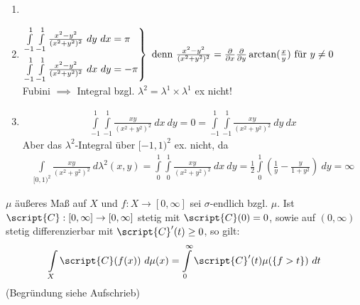   \begin{example}
    \begin{enumerate}
      \item[]
      \item 
          $\begin{rcases}
            \int\limits_{-1}^1 \int\limits_{-1}^1 \frac{x^2-y^2}{(x^2+y^2)^2} \ dy \ dx = \pi\\
            \int\limits_{-1}^1 \int\limits_{-1}^1 \frac{x^2-y^2}{(x^2+y^2)^2} \ dx \ dy = -\pi
          \end{rcases} \text{ denn } \frac{x^2-y^2}{(x^2+y^2)^2} = \frac{\partial}{\partial x} \frac{\partial}{\partial y} \arctan(\frac{x}{y}) \text{ für } y \neq 0$\\
          Fubini $\implies$ Integral bzgl. $\lambda^2 = \lambda^1 \times \lambda^1$ ex nicht!
      \item
        \begin{align*}
          \int\limits_{-1}^1 \int\limits_{-1}^1 \frac{xy}{(x^2+y^2)^2} \ dx \ dy = 0 = \int\limits_{-1}^1 \int\limits_{-1}^1 \frac{xy}{(x^2+y^2)^2} \ dy \ dx
        \end{align*}
        Aber das $\lambda^2$-Integral über $[-1,1)^2$ ex. nicht, da
        \begin{align*}
          \int\limits_{[0,1)^2} \frac{xy}{(x^2+y^2)^2} \ d\lambda^2(x,y) = \int\limits_0^1 \int\limits_0^1 \frac{xy}{(x^2+y^2)^2} \ dx \ dy = \frac{1}{2} \int\limits_0^1 (\frac{1}{y} - \frac{y}{1+y^2}) \ dy = \infty
        \end{align*}
    \end{enumerate}
  \end{example}

  \begin{example}
    $\mu$ äußeres Maß auf $X$ und $f: X \to [0, \infty]$ sei $\sigma$-endlich bzgl. $\mu$. Ist $\script{C}:[0,\infty] \to [0, \infty]$ stetig mit $\script{C}(0) = 0$, sowie auf $(0, \infty)$ stetig differenzierbar mit $\script{C}'(t)\geq0$, so gilt:
    \begin{align*}
      \int\limits_X \script{C}(f(x)) \ d\mu(x) = \int\limits_0^{\infty} \script{C}'(t) \mu(\{f > t\}) \ dt
    \end{align*}
    (Begründung siehe Aufschrieb)
  \end{example}

